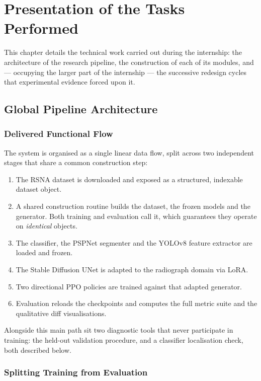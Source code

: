 \chapter{Presentation of the Tasks Performed}
\label{ch:tasks}

This chapter details the technical work carried out during the
internship: the architecture of the research pipeline, the construction
of each of its modules, and --- occupying the larger part of the
internship --- the successive redesign cycles that experimental evidence
forced upon it.

\section{Global Pipeline Architecture}

\subsection{Delivered Functional Flow}

The system is organised as a single linear data flow, split across two
independent stages that share a common construction step:

\begin{enumerate}[leftmargin=*]
  \item The RSNA dataset is downloaded and exposed as a structured,
        indexable dataset object.
  \item A shared construction routine builds the dataset, the frozen
        models and the generator. Both training and evaluation call it,
        which guarantees they operate on \emph{identical} objects.
  \item The classifier, the PSPNet segmenter and the YOLOv8 feature
        extractor are loaded and frozen.
  \item The Stable Diffusion UNet is adapted to the radiograph domain via
        LoRA.
  \item Two directional PPO policies are trained against that adapted
        generator.
  \item Evaluation reloads the checkpoints and computes the full metric
        suite and the qualitative diff visualisations.
\end{enumerate}

Alongside this main path sit two diagnostic tools that never participate
in training: the held-out validation procedure, and a classifier
localisation check, both described below.

\subsection{Splitting Training from Evaluation}
\label{sec:walltime}

